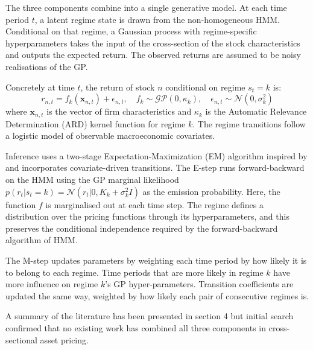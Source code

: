 \documentclass[11pt]{article}
\begin{document}
The three components combine into a single generative model. At each time period $t$, a latent regime state is drawn from the non-homogeneous HMM. Conditional on that regime, a Gaussian process with regime-specific hyperparameters takes the input of the cross-section of the stock characteristics and outputs the expected return. The observed returns are assumed to be noisy realisations of the GP.

Concretely at time $t$, the return of stock $n$ conditional on regime $s_t = k$ is:
\begin{equation*}
    r_{n,t} = f_k(\textbf{x}_{n,t}) + \epsilon_{n,t}, \quad f_k \sim \mathcal{GP}(0, \kappa_k), \quad \epsilon_{n,t} \sim \mathcal{N}(0, \sigma^2_k)
\end{equation*}
where $\textbf{x}_{n,t}$ is the vector of firm characteristics and $\kappa_k$ is the Automatic Relevance Determination (ARD) kernel function for regime $k$. The regime transitions follow a logistic model of observable macroeconomic covariates.

Inference uses a two-stage Expectation-Maximization (EM) algorithm inspired by \cite{li_hidden_2023} and incorporates covariate-driven transitions. The E-step runs forward-backward on the HMM using the GP marginal likelihood $p(r_t | s_t = k) = \mathcal{N}(r_t | 0, K_k + \sigma^2_k I)$ as the emission probability. Here, the function $f$ is marginalised out at each time step. The regime defines a distribution over the pricing functions through its hyperparameters, and this preserves the conditional independence required by the forward-backward algorithm of HMM. 

The M-step updates parameters by weighting each time period by how likely it is to belong to each regime. Time periods that are more likely in regime $k$ have more influence on regime $k$'s GP hyper-parameters. Transition coefficients are updated the same way, weighted by how likely each pair of consecutive regimes is. 


A summary of the literature has been presented in section 4 but initial search confirmed that no existing work has combined all three components in cross-sectional asset pricing.
\end{document}
